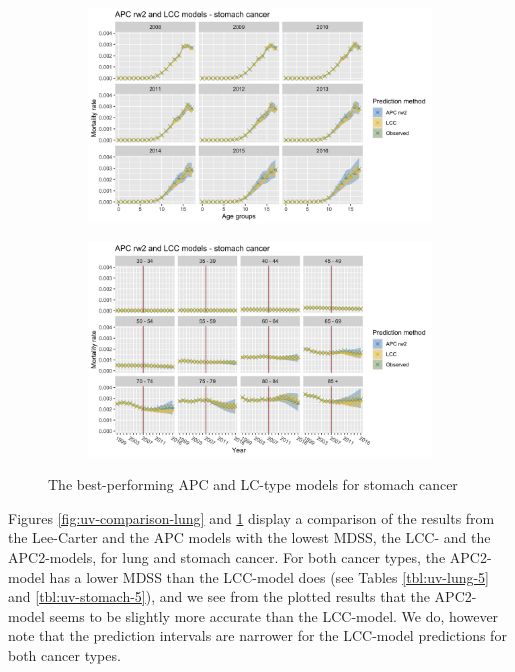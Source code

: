 \begin{figure}[h!]
    \centering
    \begin{subfigure}[b]{.45\linewidth}
        \includegraphics[width=\linewidth]{real-data/real-data-univariate/Figures/univariate-comparison-by-age-stomach.png}
    \end{subfigure}
    \begin{subfigure}[b]{.45\linewidth}
        \includegraphics[width=\linewidth]{real-data/real-data-univariate/Figures/univariate-comparison-by-period-stomach.png}
    \end{subfigure}
    \caption{The best-performing APC and LC-type models for stomach cancer}
    \label{fig:uv-comparison-stomach}
\end{figure}

Figures \ref{fig:uv-comparison-lung} and \ref{fig:uv-comparison-stomach} display a comparison of the results from the Lee-Carter and the APC models with the lowest MDSS, the LCC- and the APC2-models, for lung and stomach cancer. For both cancer types, the APC2-model has a lower MDSS than the LCC-model does (see Tables \ref{tbl:uv-lung-5} and \ref{tbl:uv-stomach-5}), and we see from the plotted results that the APC2-model seems to be slightly more accurate than the LCC-model. We do, however note that the prediction intervals are narrower for the LCC-model predictions for both cancer types.

